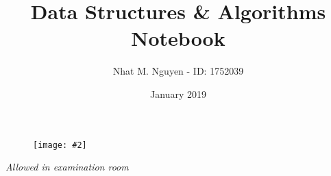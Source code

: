 \documentclass[9pt, landscape, a4paper]{article}
\title{\vspace{-4ex}\Large{Data Structures \& Algorithms Notebook}}
\author{Nhat M. Nguyen - ID: 1752039}
\date{January 2019}
\newcommand{\ti}[1]{\textit{#1}}
\newcommand{\img}[2][]
  {
    \begin{figure}[H]
      \centering
      \texttt{[image: \#2]}
    \end{figure}
  }
\begin{document}
  \maketitle
  \img[width=3cm]{logo.jpeg}
  \setcounter{tocdepth}{2}
  \begin{multicols}{2}
    \tableofcontents
  \end{multicols}
  \begin{center}
  \ti{Allowed in examination room}
  \end{center}
\clearpage
\begin{multicols}{2}

\end{multicols}
\end{document}
